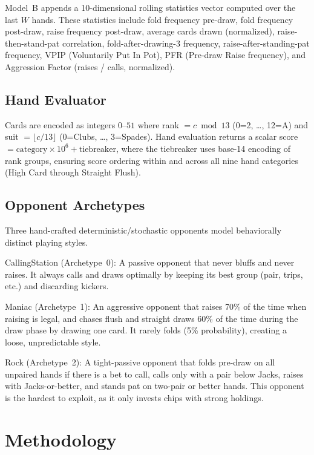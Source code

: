 \documentclass[conference]{IEEEtran}
\begin{document}
Model~B appends a 10-dimensional rolling statistics vector
computed over the last $W$ hands. These statistics include fold frequency pre-draw, fold frequency post-draw, raise frequency post-draw, average cards drawn (normalized), raise-then-stand-pat correlation, fold-after-drawing-3 frequency, raise-after-standing-pat frequency, VPIP (Voluntarily Put In Pot), PFR (Pre-draw Raise frequency), and Aggression Factor (raises / calls, normalized).

\subsection{Hand Evaluator}

Cards are encoded as integers $0$--$51$ where rank $= c \bmod 13$ (0=2, \ldots, 12=A) and suit $= \lfloor c / 13 \rfloor$ (0=Clubs, \ldots, 3=Spades). Hand evaluation returns a scalar score $= \text{category} \times 10^6 + \text{tiebreaker}$, where the tiebreaker uses base-14 encoding of rank groups, ensuring score ordering within and across all nine hand categories (High Card through Straight Flush).

\subsection{Opponent Archetypes}

Three hand-crafted deterministic/stochastic opponents model
behaviorally distinct playing styles.

CallingStation (Archetype~0): A passive opponent that never
bluffs and never raises. It always calls and draws optimally by
keeping its best group (pair, trips, etc.) and discarding kickers.

Maniac (Archetype~1): An aggressive opponent that raises
70\% of the time when raising is legal, and chases flush and straight
draws 60\% of the time during the draw phase by drawing one card.
It rarely folds (5\% probability), creating a loose, unpredictable style.

Rock (Archetype~2): A tight-passive opponent that folds
pre-draw on all unpaired hands if there is a bet to call, calls only
with a pair below Jacks, raises with Jacks-or-better, and stands pat
on two-pair or better hands. This opponent is the hardest to exploit,
as it only invests chips with strong holdings.

\section{Methodology}
\label{sec:method}
\end{document}

